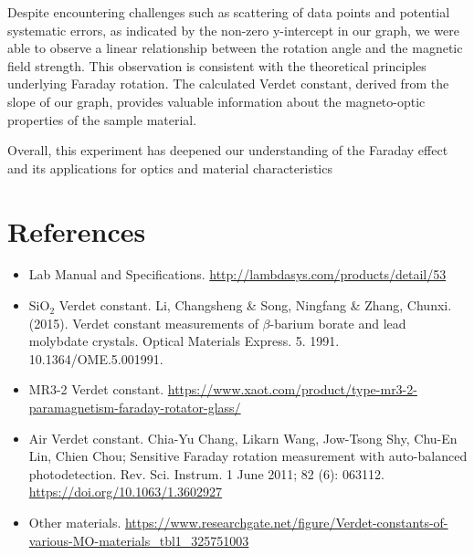 \documentclass[11pt]{article}
\begin{document}
	Despite encountering challenges such as scattering of data points and potential systematic errors, as indicated by the non-zero y-intercept in our graph, we were able to observe a linear relationship between the rotation angle and the magnetic field strength. This observation is consistent with the theoretical principles underlying Faraday rotation.	The calculated Verdet constant, derived from the slope of our graph, provides valuable information about the magneto-optic properties of the sample material.

	Overall, this experiment has deepened our understanding of the Faraday effect and its applications for optics and material characteristics

\clearpage

	\section{References}
	\begin{itemize}
		\item Lab Manual and Specifications. \href{http://lambdasys.com/products/detail/53}{http://lambdasys.com/products/detail/53}
		\item $\text{SiO}_2$ Verdet constant. Li, Changsheng \& Song, Ningfang \& Zhang, Chunxi. (2015). Verdet constant measurements of $\beta$-barium borate and lead molybdate crystals. Optical Materials Express. 5. 1991. 10.1364/OME.5.001991.
		\item MR3-2 Verdet constant. \href{https://www.xaot.com/product/type-mr3-2-paramagnetism-faraday-rotator-glass/}{https://www.xaot.com/product/type-mr3-2-paramagnetism-faraday-rotator-glass/}
		\item Air Verdet constant. Chia-Yu Chang, Likarn Wang, Jow-Tsong Shy, Chu-En Lin, Chien Chou; Sensitive Faraday rotation measurement with auto-balanced photodetection. Rev. Sci. Instrum. 1 June 2011; 82 (6): 063112. \href{https://doi.org/10.1063/1.3602927}{https://doi.org/10.1063/1.3602927}
		\item Other materials. \href{https://www.researchgate.net/figure/Verdet-constants-of-various-MO-materials\_tbl1\_325751003}{https://www.researchgate.net/figure/Verdet-constants-of-various-MO-materials\_tbl1\_325751003}
	\end{itemize}
\end{document}

